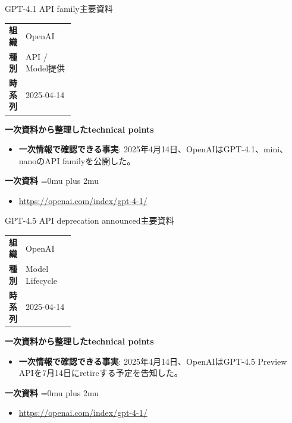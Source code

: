 \begin{technicalnote}{GPT-4.1 API family}{主要資料}
\begingroup
\begin{tabularx}{\linewidth}{@{}>{\bfseries}p{0.22\linewidth}X@{}}
組織 & OpenAI \\
種別 & API / Model提供 \\
時系列 & 2025-04-14 \\
\end{tabularx}
\smallskip
{\bfseries 一次資料から整理したtechnical points}
\begin{itemize}[leftmargin=1.5em,itemsep=0.35em]
\item \textbf{一次情報で確認できる事実}: 2025年4月14日、OpenAIはGPT-4.1、mini、nanoのAPI familyを公開した。
\end{itemize}
\begin{samepage}
{\bfseries 一次資料}
\begingroup\sloppy
\Urlmuskip=0mu plus 2mu\relax
\begin{itemize}[leftmargin=1.5em,itemsep=0.25em]
\item {\scriptsize\url{https://openai.com/index/gpt-4-1/}}
\end{itemize}
\endgroup
\end{samepage}
\endgroup
\end{technicalnote}
\medskip

\begin{technicalnote}{GPT-4.5 API deprecation announced}{主要資料}
\begingroup
\begin{tabularx}{\linewidth}{@{}>{\bfseries}p{0.22\linewidth}X@{}}
組織 & OpenAI \\
種別 & Model Lifecycle \\
時系列 & 2025-04-14 \\
\end{tabularx}
\smallskip
{\bfseries 一次資料から整理したtechnical points}
\begin{itemize}[leftmargin=1.5em,itemsep=0.35em]
\item \textbf{一次情報で確認できる事実}: 2025年4月14日、OpenAIはGPT-4.5 Preview APIを7月14日にretireする予定を告知した。
\end{itemize}
\begin{samepage}
{\bfseries 一次資料}
\begingroup\sloppy
\Urlmuskip=0mu plus 2mu\relax
\begin{itemize}[leftmargin=1.5em,itemsep=0.25em]
\item {\scriptsize\url{https://openai.com/index/gpt-4-1/}}
\end{itemize}
\endgroup
\end{samepage}
\endgroup
\end{technicalnote}
\medskip


